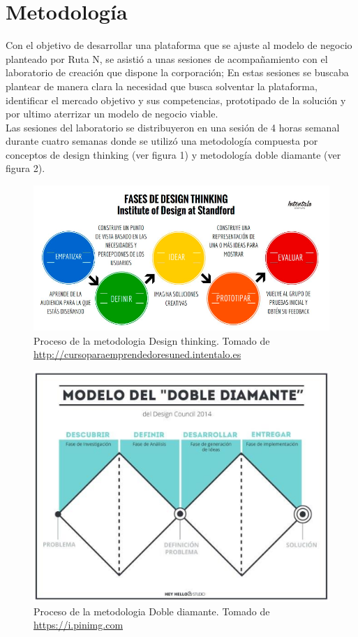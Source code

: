 \onehalfspacing
\chapter*{Metodología}
Con el objetivo de desarrollar una plataforma que se ajuste al modelo de negocio  planteado por Ruta N, se asistió a unas sesiones de acompañamiento con el  laboratorio de creación que dispone la corporación; En estas sesiones se buscaba  plantear de manera clara la necesidad que busca solventar la plataforma, identificar el mercado objetivo y sus competencias, prototipado de la solución y por ultimo  aterrizar un modelo de negocio viable. \\

Las sesiones del laboratorio se distribuyeron en una sesión de 4 horas
semanal  durante cuatro semanas donde se utilizó una  metodología compuesta por conceptos  de design thinking (ver figura 1) y  metodología doble diamante (ver figura 2).


\begin{figure}[ht]
  \includegraphics[width=\linewidth, center]{images/design_thinking.PNG}
  \caption{Proceso de la metodologia Design thinking. Tomado de \url{http://cursoparaemprendedoresuned.intentalo.es}}
  \label{fig:img1}
\end{figure}

\begin{figure}[]
  \includegraphics[scale=0.8, center]{images/doble_diamante.PNG}
  \caption{Proceso de la metodologia Doble diamante. Tomado de \url{https://i.pinimg.com}}
  \label{fig:img2}
\end{figure}


